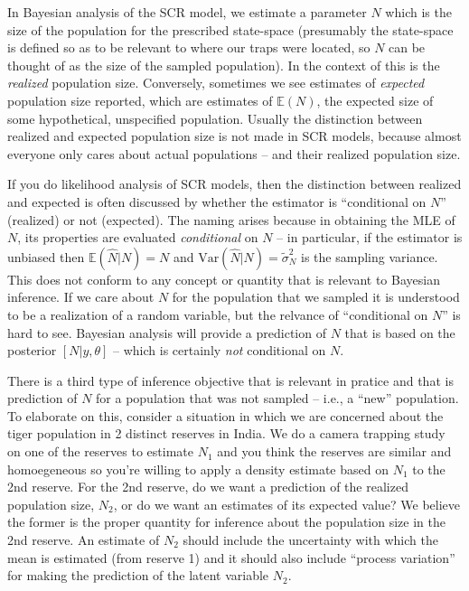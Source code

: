 In Bayesian analysis of the SCR model, we estimate a parameter $N$
which is the size of the population for the prescribed state-space
(presumably the state-space is defined so as to be relevant to where
our traps were located, so $N$ can be thought of as the size of the
sampled population). In the context of \citet{efford_fewster:2012}
this is the {\it realized} population size. Conversely, sometimes we
see estimates of {\it expected} population size reported, which are
estimates of $\mathbb{E}(N)$,
the expected size of some hypothetical,
unspecified population.  Usually the distinction between realized
and expected population size is not made in SCR models, because almost
everyone only cares about  actual populations -- and their realized
population size.

If you do likelihood analysis of SCR models, then the distinction between realized and
expected is often discussed by whether the estimator is ``conditional on $N$''
(realized) or not (expected). The naming arises because in obtaining
the MLE of $N$, its properties are evaluated
{\it conditional} on $N$ --
in particular, if the estimator is unbiased then $\mathbb{E}(\hat{N}|N) = N$ and
$\mbox{Var}(\hat{N}|N) = \tilde{\sigma}_{N}^{2}$
is the sampling variance.
This 
does not conform to any concept or quantity that is relevant to
Bayesian inference.  If we care about $N$ for the population that we
sampled it is understood to be a
realization of a random variable, but the relvance of ``conditional on
$N$'' is hard to see. Bayesian analysis will provide a prediction of
$N$ that is based on the posterior $[N|y,\theta]$ -- which is
certainly {\it not} conditional on $N$.

There is a third type of inference objective that is relevant
in pratice and that is prediction of $N$ for a population that was not
sampled -- i.e., a ``new'' population.
To elaborate on this, consider a situation in which we are
concerned about the tiger population in 2 distinct reserves in India.
We do a camera trapping study on one of the reserves to estimate
$N_{1}$ and you think the reserves are similar and homoegeneous so
you're willing to apply a density estimate based on $N_{1}$ to the 2nd
reserve. For the 2nd reserve, do we want a prediction of the realized
population size, $N_{2}$, or do we want an estimates of its expected
value? We believe the former is the proper quantity for inference
about the population size in the 2nd reserve. An estimate of $N_{2}$
should include the uncertainty with which the mean is estimated (from
reserve 1) and it should also include ``process variation'' for making
the prediction of the latent variable $N_{2}$.

